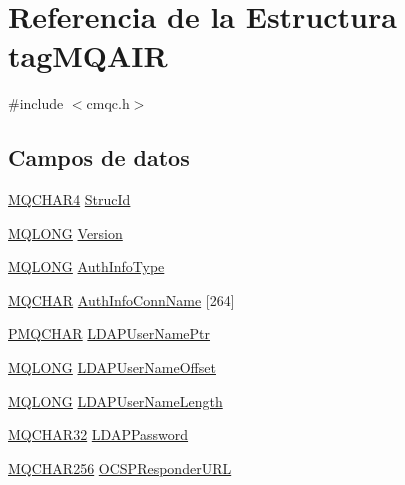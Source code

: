 \hypertarget{structtag_m_q_a_i_r}{}\section{Referencia de la Estructura tag\+M\+Q\+A\+I\+R}
\label{structtag_m_q_a_i_r}


{\ttfamily \#include $<$cmqc.\+h$>$}

\subsection*{Campos de datos}
\begin{DoxyCompactItemize}
\item 
\hyperlink{cmqc_8h_a12590e546ed66fda7cf21c1d5cefa31d}{M\+Q\+C\+H\+A\+R4} \hyperlink{structtag_m_q_a_i_r_a0530922ca944569b52601d74941f96e4}{Struc\+Id}
\item 
\hyperlink{cmqc_8h_a1fb8d28cbda3fa8766a9821230cdb6d5}{M\+Q\+L\+O\+N\+G} \hyperlink{structtag_m_q_a_i_r_a0656ef8f766b3907d394d88a35d7b7e9}{Version}
\item 
\hyperlink{cmqc_8h_a1fb8d28cbda3fa8766a9821230cdb6d5}{M\+Q\+L\+O\+N\+G} \hyperlink{structtag_m_q_a_i_r_ab6d5732a34c9e5537251a011b7c5cfd2}{Auth\+Info\+Type}
\item 
\hyperlink{cmqc_8h_aeb12bc7ba416a4eb603e2a74351418d2}{M\+Q\+C\+H\+A\+R} \hyperlink{structtag_m_q_a_i_r_ae500a619d5c7accb19d376cc8e90b542}{Auth\+Info\+Conn\+Name} \mbox{[}264\mbox{]}
\item 
\hyperlink{cmqc_8h_a6c7816c5bbcf1856a25a4558df856937}{P\+M\+Q\+C\+H\+A\+R} \hyperlink{structtag_m_q_a_i_r_afd5202d66986643207bde23232f8dfe6}{L\+D\+A\+P\+User\+Name\+Ptr}
\item 
\hyperlink{cmqc_8h_a1fb8d28cbda3fa8766a9821230cdb6d5}{M\+Q\+L\+O\+N\+G} \hyperlink{structtag_m_q_a_i_r_a09b5d1f5f57fa530f91d06550e1c1f2a}{L\+D\+A\+P\+User\+Name\+Offset}
\item 
\hyperlink{cmqc_8h_a1fb8d28cbda3fa8766a9821230cdb6d5}{M\+Q\+L\+O\+N\+G} \hyperlink{structtag_m_q_a_i_r_a849bc6c195d62939eafc7783284d4314}{L\+D\+A\+P\+User\+Name\+Length}
\item 
\hyperlink{cmqc_8h_a0b7dd696f0148465fe80f6eae57b38a2}{M\+Q\+C\+H\+A\+R32} \hyperlink{structtag_m_q_a_i_r_aeec928bfebc24320430fca7f05918450}{L\+D\+A\+P\+Password}
\item 
\hyperlink{cmqc_8h_ac492686cf8a90cc3dbc1c48143707ca7}{M\+Q\+C\+H\+A\+R256} \hyperlink{structtag_m_q_a_i_r_a8e3ec4c8973e460828f035270c03144c}{O\+C\+S\+P\+Responder\+U\+R\+L}
\end{DoxyCompactItemize}


